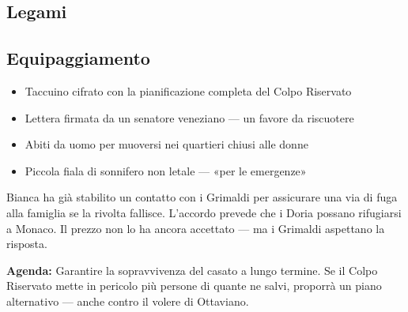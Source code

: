
\subsection*{Legami}

\subsection*{Equipaggiamento}
\begin{itemize}
  \item Taccuino cifrato con la pianificazione completa del Colpo Riservato
  \item Lettera firmata da un senatore veneziano — un favore da riscuotere
  \item Abiti da uomo per muoversi nei quartieri chiusi alle donne
  \item Piccola fiala di sonnifero non letale — «per le emergenze»
\end{itemize}

\begin{secretbox}
Bianca ha già stabilito un contatto con i Grimaldi per assicurare una via
di fuga alla famiglia se la rivolta fallisce. L'accordo prevede che i Doria
possano rifugiarsi a Monaco. Il prezzo non lo ha ancora accettato — ma i
Grimaldi aspettano la risposta.

\medskip
\textbf{\textcolor{SecretRed}{Agenda:}} Garantire la sopravvivenza del casato a lungo termine.
Se il Colpo Riservato mette in pericolo più persone di quante ne salvi,
proporrà un piano alternativo — anche contro il volere di Ottaviano.
\end{secretbox}

